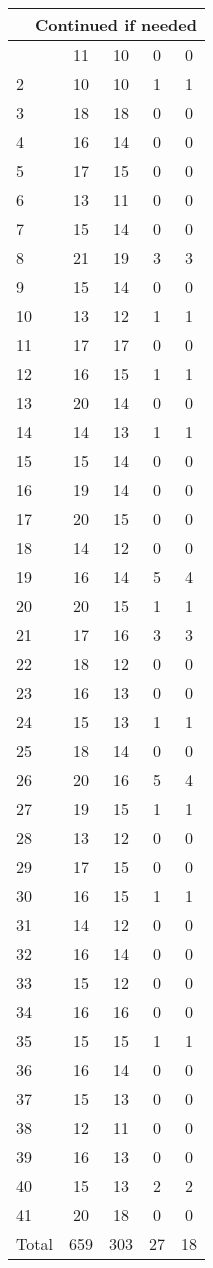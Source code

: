 \begin{center}
\begin{longtable}{l|c|c|c|c}
\hline \multicolumn{5}{|r|}{{Continued if needed}} \\ \hline
\endfoot 
1 & 11 & 10 & 0 & 0\\ \hline
2 & 10 & 10 & 1 & 1\\ \hline
3 & 18 & 18 & 0 & 0\\ \hline
4 & 16 & 14 & 0 & 0\\ \hline
5 & 17 & 15 & 0 & 0\\ \hline
6 & 13 & 11 & 0 & 0\\ \hline
7 & 15 & 14 & 0 & 0\\ \hline
8 & 21 & 19 & 3 & 3\\ \hline
9 & 15 & 14 & 0 & 0\\ \hline
10 & 13 & 12 & 1 & 1\\ \hline
11 & 17 & 17 & 0 & 0\\ \hline
12 & 16 & 15 & 1 & 1\\ \hline
13 & 20 & 14 & 0 & 0\\ \hline
14 & 14 & 13 & 1 & 1\\ \hline
15 & 15 & 14 & 0 & 0\\ \hline
16 & 19 & 14 & 0 & 0\\ \hline
17 & 20 & 15 & 0 & 0\\ \hline
18 & 14 & 12 & 0 & 0\\ \hline
19 & 16 & 14 & 5 & 4\\ \hline
20 & 20 & 15 & 1 & 1\\ \hline
21 & 17 & 16 & 3 & 3\\ \hline
22 & 18 & 12 & 0 & 0\\ \hline
23 & 16 & 13 & 0 & 0\\ \hline
24 & 15 & 13 & 1 & 1\\ \hline
25 & 18 & 14 & 0 & 0\\ \hline
26 & 20 & 16 & 5 & 4\\ \hline
27 & 19 & 15 & 1 & 1\\ \hline
28 & 13 & 12 & 0 & 0\\ \hline
29 & 17 & 15 & 0 & 0\\ \hline
30 & 16 & 15 & 1 & 1\\ \hline
31 & 14 & 12 & 0 & 0\\ \hline
32 & 16 & 14 & 0 & 0\\ \hline
33 & 15 & 12 & 0 & 0\\ \hline
34 & 16 & 16 & 0 & 0\\ \hline
35 & 15 & 15 & 1 & 1\\ \hline
36 & 16 & 14 & 0 & 0\\ \hline
37 & 15 & 13 & 0 & 0\\ \hline
38 & 12 & 11 & 0 & 0\\ \hline
39 & 16 & 13 & 0 & 0\\ \hline
40 & 15 & 13 & 2 & 2\\ \hline
41 & 20 & 18 & 0 & 0\\ \hline
\hline \hline
Total & 659 & 303 & 27 & 18



\end{longtable}
\end{center}

